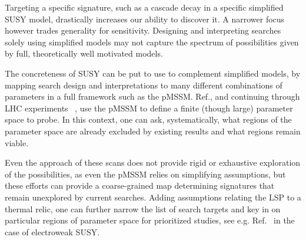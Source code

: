 


Targeting a specific signature, such as a cascade decay in a specific simplified SUSY model, 
drastically increases our ability to discover it. A narrower focus however trades generality for sensitivity. 
Designing and interpreting searches solely using simplified models may not capture the spectrum of possibilities
given by full, theoretically well motivated models. 

The concreteness of SUSY can be put to use to complement simplified models, by mapping search design and
interpretations to many different combinations of parameters in a full framework such as the pMSSM. 
Ref.\cite{Conley:2010du}, and continuing through LHC experiments ~\cite{Aad:2015baa, Khachatryan:2016nvf},
use the pMSSM to define a finite (though large) parameter space to probe. In this context, 
one can ask, systematically, what regions of the parameter space are already excluded by
existing results and what regions remain viable. 

Even the approach of these scans does not provide rigid or exhaustive exploration of the possibilities,
as even the pMSSM relies on simplifying assumptions, but these efforts can provide a coarse-grained
map determining signatures that remain unexplored by current searches.  
Adding assumptions relating the LSP to a thermal relic, one can further narrow the list of search
targets and key in on particular regions of parameter space for prioritized studies, see e.g. Ref.~\cite{Aaboud:2016wna}
in the case of electroweak SUSY. 

